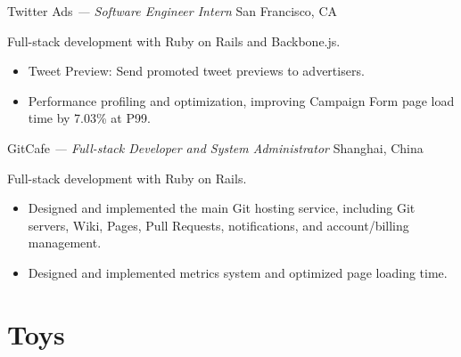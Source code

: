 \documentclass[]{friggeri-cv}
\begin{document}
\begin{entrylist}
  {Twitter Ads \emph{--- Software Engineer Intern}}
  {San Francisco, CA}
  {
    Full-stack development with Ruby on Rails and Backbone.js.\@
    \begin{itemize}
      \item Tweet Preview: Send promoted tweet previews to advertisers.
      \item Performance profiling and optimization, improving Campaign Form page load time by 7.03\% at P99.
    \end{itemize}
  }
  {GitCafe \emph{--- Full-stack Developer and System Administrator}}
  {Shanghai, China}
  {
    Full-stack development with Ruby on Rails.
    \begin{itemize}
      \item Designed and implemented the main Git hosting service, including Git servers, Wiki, Pages,
      Pull Requests, notifications, and account/billing management.
      \item Designed and implemented metrics system and optimized page loading time.
    \end{itemize}
  }
\end{entrylist}


\section{Toys}
\end{document}
